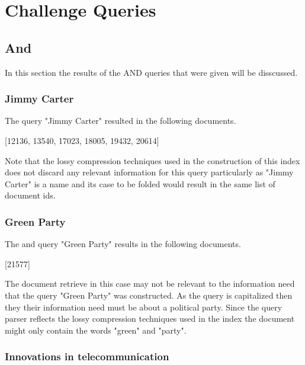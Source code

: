 \section{Challenge Queries}

\subsection{And}

\par In this section the results of the AND queries that were given will be disscussed.

\subsubsection{Jimmy Carter}

\par The query "Jimmy Carter" resulted in the following documents.
\begin{center}
    [12136, 13540, 17023, 18005, 19432, 20614]
\end{center}

\par Note that the lossy compression techniques used in the construction of this index does not discard any relevant information for this query particularly as "Jimmy Carter" is a name and its case to be folded would result in the same list of document ids.

\subsubsection{Green Party}

\par The and query "Green Party" results in the following documents.
\begin{center}
    [21577]
\end{center}

\par The document retrieve in this case may not be relevant to the information need that the query "Green Party" was constructed. As the query is capitalized then they their information need must be about a political party. Since the query parser reflects the lossy compression techniques used in the index the document might only contain the words "green" and "party".

\subsubsection{Innovations in telecommunication}

